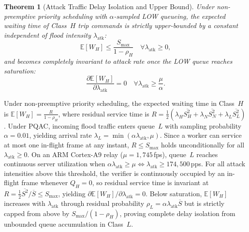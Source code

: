 \documentclass[journal]{IEEEtran}
\newtheorem{theorem}{Theorem}
\newenvironment{proof}{\begin{IEEEproof}}{\end{IEEEproof}}
\begin{document}
\begin{theorem}[Attack Traffic Delay Isolation and Upper Bound]
\label{thm:isolation}
Under non-preemptive priority scheduling with $\alpha$-sampled LOW queueing, the expected waiting time of Class~$H$ trip commands is strictly upper-bounded by a constant independent of flood intensity $\lambda_{\text{atk}}$:
\begin{equation}
\mathbb{E}[W_H] \le \frac{S_{\max}}{1 - \rho_H} \quad \forall \lambda_{\text{atk}} \ge 0,
\end{equation}
and becomes completely invariant to attack rate once the LOW queue reaches saturation:
\begin{equation}
\frac{\partial \mathbb{E}[W_H]}{\partial \lambda_{\text{atk}}} = 0 \quad \forall \lambda_{\text{atk}} \ge \frac{\mu}{\alpha}.
\end{equation}
\end{theorem}
\begin{proof}
Under non-preemptive priority scheduling, the expected waiting time in Class~$H$ is $\mathbb{E}[W_H] = \frac{R}{1 - \rho_H}$, where residual service time is $R = \frac{1}{2}(\lambda_H \overline{S_H^2} + \lambda_N \overline{S_N^2} + \lambda_L \overline{S_L^2})$. Under PQAC, incoming flood traffic enters queue~$L$ with sampling probability $\alpha = 0.01$, yielding arrival rate $\lambda_L = \min(\alpha \lambda_{\text{atk}}, \mu)$. Since a worker can service at most one in-flight frame at any instant, $R \le S_{\max}$ holds unconditionally for all $\lambda_{\text{atk}} \ge 0$. On an ARM Cortex-A9 relay ($\mu = 1{,}745$\,fps), queue~$L$ reaches continuous server utilization when $\alpha \lambda_{\text{atk}} \ge \mu \iff \lambda_{\text{atk}} \ge 174{,}500$\,pps. For all attack intensities above this threshold, the verifier is continuously occupied by an in-flight frame whenever $Q_H=0$, so residual service time is invariant at $R = \frac{1}{2}\overline{S^2}/\overline{S} \le S_{\max}$, yielding $\partial \mathbb{E}[W_H] / \partial \lambda_{\text{atk}} = 0$. Below saturation, $\mathbb{E}[W_H]$ increases with $\lambda_{\text{atk}}$ through residual probability $\rho_L = \alpha \lambda_{\text{atk}}\overline{S}$ but is strictly capped from above by $S_{\max}/(1 - \rho_H)$, proving complete delay isolation from unbounded queue accumulation in Class~$L$.
\end{proof}
\end{document}
